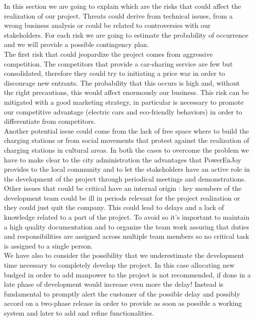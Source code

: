 In this section we are going to explain which are the risks that could affect the realization of our project.
Threats could derive from technical issues, from a wrong business analysis or could be related to controversies with our stakeholders.
For each risk we are going to estimate the probability of occurrence and we will provide a possible contingency plan.\\
The first risk that could jeopardize the project comes from aggressive competition. The competitors that provide a car-sharing service are few but consolidated, therefore they could try to initiating a price war in order to discourage new entrants. The probability that this occurs is high and, without the right precautions, this would affect enormously our business. This risk can be mitigated with a good marketing strategy, in particular is necessary to promote our competitive advantage (electric cars and eco-friendly behaviors) in order to differentiate from competitors.\\
Another potential issue could come from the lack of free space where to build the charging stations or from social movements that protest against the realization of charging stations in cultural areas. In both the cases to overcome the problem we have to make clear to the city administration the advantages that PowerEnJoy provides to the local community and to let the stakeholders have an active role in the development of the project through periodical meetings and demonstrations.\\
Other issues that could be critical have an internal origin : key members of the development team could be ill in periods relevant for the project realization or they could just quit the company. This could lead to delays and a lack of knowledge related to a part of the project. To avoid so it's important to maintain a high quality documentation and to organize the team work assuring that duties and responsibilities are assigned across multiple team members so no critical task is assigned to a single person.\\
We have also to consider the possibility that we underestimate the development time necessary to completely develop the project. In this case allocating new budged in order to add manpower to the project is not recommended, if done in a late phase of development would increase even more the delay! Instead is fundamental to promptly alert the customer of the possible delay and possibly accord on a two-phase release in order to provide as soon as possible a working system and later to add and refine functionalities.\\
